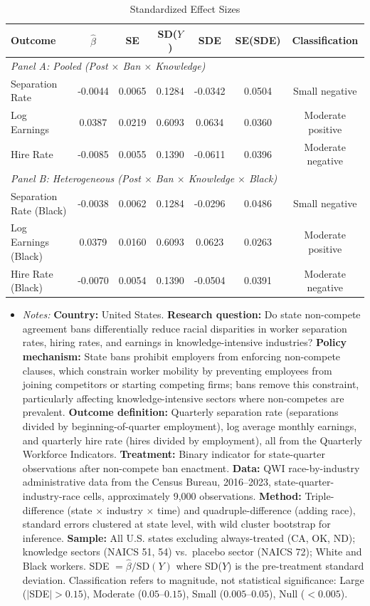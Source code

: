 \begin{table}[t]
\centering
\caption{Standardized Effect Sizes}
\label{tab:sde}
\small
\begin{tabular}{lcccccc}
\hline\hline
Outcome & $\hat{\beta}$ & SE & SD($Y$) & SDE & SE(SDE) & Classification \\
\hline
\multicolumn{7}{l}{\textit{Panel A: Pooled (Post $\times$ Ban $\times$ Knowledge)}} \\
\hline
Separation Rate & -0.0044 & 0.0065 & 0.1284 & -0.0342 & 0.0504 & Small negative \\
Log Earnings & 0.0387 & 0.0219 & 0.6093 & 0.0634 & 0.0360 & Moderate positive \\
Hire Rate & -0.0085 & 0.0055 & 0.1390 & -0.0611 & 0.0396 & Moderate negative \\
\hline
\multicolumn{7}{l}{\textit{Panel B: Heterogeneous (Post $\times$ Ban $\times$ Knowledge $\times$ Black)}} \\
\hline
Separation Rate (Black) & -0.0038 & 0.0062 & 0.1284 & -0.0296 & 0.0486 & Small negative \\
Log Earnings (Black) & 0.0379 & 0.0160 & 0.6093 & 0.0623 & 0.0263 & Moderate positive \\
Hire Rate (Black) & -0.0070 & 0.0054 & 0.1390 & -0.0504 & 0.0391 & Moderate negative \\
\hline\hline
\end{tabular}
\begin{itemize}[leftmargin=*,nosep]
\item \textit{Notes:} \textbf{Country:} United States. \textbf{Research question:} Do state non-compete agreement bans differentially reduce racial disparities in worker separation rates, hiring rates, and earnings in knowledge-intensive industries? \textbf{Policy mechanism:} State bans prohibit employers from enforcing non-compete clauses, which constrain worker mobility by preventing employees from joining competitors or starting competing firms; bans remove this constraint, particularly affecting knowledge-intensive sectors where non-competes are prevalent. \textbf{Outcome definition:} Quarterly separation rate (separations divided by beginning-of-quarter employment), log average monthly earnings, and quarterly hire rate (hires divided by employment), all from the Quarterly Workforce Indicators. \textbf{Treatment:} Binary indicator for state-quarter observations after non-compete ban enactment. \textbf{Data:} QWI race-by-industry administrative data from the Census Bureau, 2016--2023, state-quarter-industry-race cells, approximately 9,000 observations. \textbf{Method:} Triple-difference (state $\times$ industry $\times$ time) and quadruple-difference (adding race), standard errors clustered at state level, with wild cluster bootstrap for inference. \textbf{Sample:} All U.S. states excluding always-treated (CA, OK, ND); knowledge sectors (NAICS 51, 54) vs.\ placebo sector (NAICS 72); White and Black workers. SDE $= \hat{\beta} / \text{SD}(Y)$ where SD($Y$) is the pre-treatment standard deviation. Classification refers to magnitude, not statistical significance: Large ($|$SDE$| > 0.15$), Moderate ($0.05$--$0.15$), Small ($0.005$--$0.05$), Null ($< 0.005$). 
\end{itemize}
\end{table}
